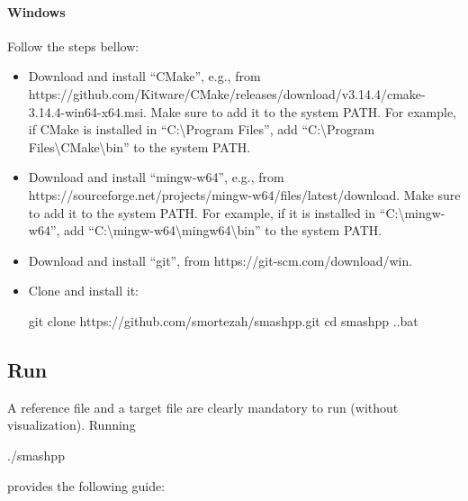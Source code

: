 \paragraph{Windows}
Follow the steps bellow:
\begin{itemize}
  \item Download and install ``CMake'', e.g., from https://github.com/Kitware/CMake/releases/\linebreak download/v3.14.4/cmake-3.14.4-win64-x64.msi. Make sure to add it to the system PATH. For example, if CMake is installed in ``C:\textbackslash Program Files'', add ``C:\textbackslash Program Files\textbackslash CMake\textbackslash bin'' to the system PATH.
  \item Download and install ``mingw-w64'', e.g., from https://sourceforge.net/projects/mingw-w64/\linebreak files/latest/download. Make sure to add it to the system PATH. For example, if it is installed in ``C:\textbackslash mingw-w64'', add ``C:\textbackslash mingw-w64\textbackslash mingw64\textbackslash bin'' to the system PATH.
  \item Download and install ``git'', from https://git-scm.com/download/win.
  \item Clone \smashpp and install it:
  \begin{code}[style=bash]
  git clone https://github.com/smortezah/smashpp.git
  cd smashpp
  .\install.bat
  \end{code}
\end{itemize}

\subsection{Run}
A reference file and a target file are clearly mandatory to run \smashpp (without visualization). Running
\begin{code}[style=bash]
  ./smashpp
\end{code}
provides the following guide:



